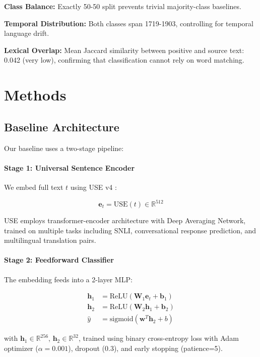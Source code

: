 \documentclass[11pt]{article}
\begin{document}
\textbf{Class Balance:} Exactly 50-50 split prevents trivial majority-class baselines.

\textbf{Temporal Distribution:} Both classes span 1719-1903, controlling for temporal language drift.

\textbf{Lexical Overlap:} Mean Jaccard similarity between positive and source text: 0.042 (very low), confirming that classification cannot rely on word matching.

\section{Methods}

\subsection{Baseline Architecture}

Our baseline uses a two-stage pipeline:

\paragraph{Stage 1: Universal Sentence Encoder}
We embed full text $t$ using USE v4 \cite{Cer2018}:

\begin{equation}
\mathbf{e}_t = \text{USE}(t) \in \mathbb{R}^{512}
\end{equation}

USE employs transformer-encoder architecture with Deep Averaging Network, trained on multiple tasks including SNLI, conversational response prediction, and multilingual translation pairs.

\paragraph{Stage 2: Feedforward Classifier}
The embedding feeds into a 2-layer MLP:

\begin{equation}
\begin{aligned}
\mathbf{h}_1 &= \text{ReLU}(\mathbf{W}_1 \mathbf{e}_t + \mathbf{b}_1) \\
\mathbf{h}_2 &= \text{ReLU}(\mathbf{W}_2 \mathbf{h}_1 + \mathbf{b}_2) \\
\hat{y} &= \text{sigmoid}(\mathbf{w}^T \mathbf{h}_2 + b)
\end{aligned}
\end{equation}

with $\mathbf{h}_1 \in \mathbb{R}^{256}$, $\mathbf{h}_2 \in \mathbb{R}^{32}$, trained using binary cross-entropy loss with Adam optimizer ($\alpha=0.001$), dropout (0.3), and early stopping (patience=5).
\end{document}
